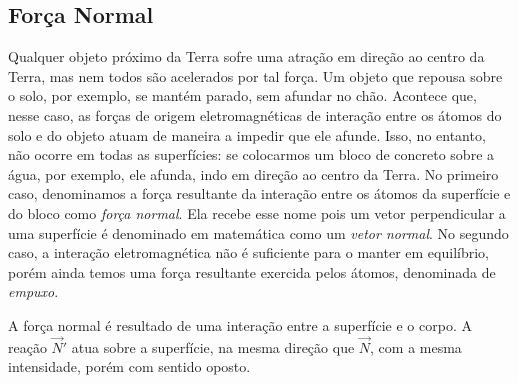 \pagebreak
\subsection{Força Normal} 

Qualquer objeto próximo da Terra sofre uma atração em direção ao centro da Terra, mas nem todos são acelerados por tal força. Um objeto que repousa sobre o solo, por exemplo, se mantém parado, sem afundar no chão. Acontece que, nesse caso, as forças de origem eletromagnéticas de interação entre os átomos do solo e do objeto atuam de maneira a impedir que ele afunde. Isso, no entanto, não ocorre em todas as superfícies: se colocarmos um bloco de concreto sobre a água, por exemplo, ele afunda, indo em direção ao centro da Terra. No primeiro caso, denominamos a força resultante da interação entre os átomos da superfície e do bloco como \emph{força normal}. Ela recebe esse nome pois um vetor perpendicular a uma superfície é denominado em matemática como um \emph{vetor normal}. No segundo caso, a interação eletromagnética não é suficiente para o manter em equilíbrio, porém ainda temos uma força resultante exercida pelos átomos, denominada de \emph{empuxo}.

\begin{marginfigure}[4cm]
\centering
{}
\caption{A força normal é resultado de uma interação entre a superfície e o corpo. A reação $\vec{N}'$ atua sobre a superfície, na mesma direção que $\vec{N}$, com a mesma intensidade, porém com sentido oposto.}
\end{marginfigure}

